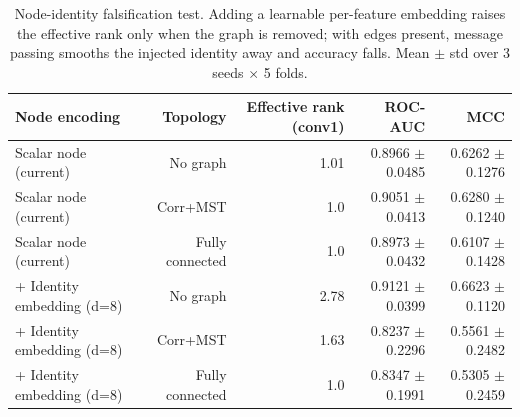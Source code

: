 \begin{table}[t]
\centering
\caption{Node-identity falsification test. Adding a learnable per-feature embedding raises the effective rank only when the graph is removed; with edges present, message passing smooths the injected identity away and accuracy falls. Mean $\pm$ std over 3 seeds $\times$ 5 folds.}
\label{tab:nodeid}
\footnotesize
\begin{tabular}{lrrrr}
\toprule
Node encoding & Topology & Effective rank (conv1) & ROC-AUC & MCC \\
\midrule
Scalar node (current) & No graph & 1.01 & 0.8966 $\pm$ 0.0485 & 0.6262 $\pm$ 0.1276 \\
Scalar node (current) & Corr+MST & 1.0 & 0.9051 $\pm$ 0.0413 & 0.6280 $\pm$ 0.1240 \\
Scalar node (current) & Fully connected & 1.0 & 0.8973 $\pm$ 0.0432 & 0.6107 $\pm$ 0.1428 \\
+ Identity embedding (d=8) & No graph & 2.78 & 0.9121 $\pm$ 0.0399 & 0.6623 $\pm$ 0.1120 \\
+ Identity embedding (d=8) & Corr+MST & 1.63 & 0.8237 $\pm$ 0.2296 & 0.5561 $\pm$ 0.2482 \\
+ Identity embedding (d=8) & Fully connected & 1.0 & 0.8347 $\pm$ 0.1991 & 0.5305 $\pm$ 0.2459 \\
\bottomrule
\end{tabular}
\end{table}
